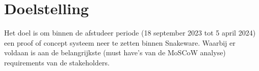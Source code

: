 \section{Doelstelling}
Het doel is om binnen de afstudeer periode (18 september 2023 tot 5 april 2024) een proof of concept systeem neer te zetten binnen Snakeware.
Waarbij er voldaan is aan de belangrijkste (must have's van de MoSCoW analyse) requirements van de stakeholders.
